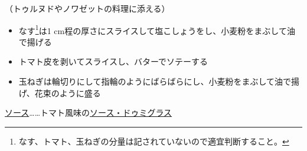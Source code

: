 \begin{recette}

（トゥルヌドやノワゼットの料理に添える）

\begin{itemize}
\item
  なす\footnote{なす、トマト、玉ねぎの分量は記されていないので適宜判断すること。}は1
  cm程の厚さにスライスして塩こしょうをし、小麦粉をまぶして油で揚げる
\item
  トマト皮を剥いてスライスし、バターでソテーする
\item
  玉ねぎは輪切りにして指輪のようにばらばらにし、小麦粉をまぶして油で揚げ、花束のように盛る
\end{itemize}

\ul{ソース}\ldots{}\ldots{}トマト風味の\protect\hyperlink{sauce-demi-glace}{ソース・ドゥミグラス}

\hypertarget{garniture-banquiere}{%
}
\end{recette}
